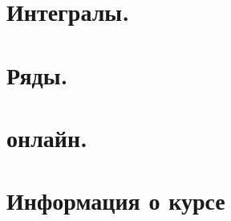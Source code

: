 \maketitle
\tableofcontents


\newpage
\section{Интегралы.}


\newpage
\section{Ряды.}


\newpage
\section{онлайн.}


\newpage
\section{Информация о курсе}
